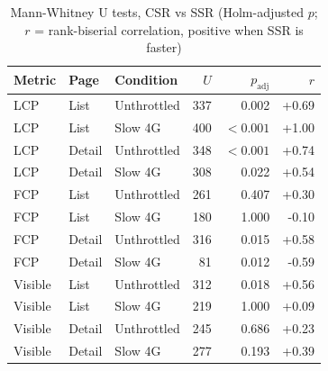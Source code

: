 \begin{table}[t]
\caption{Mann-Whitney U tests, CSR vs SSR (Holm-adjusted $p$; $r$ = rank-biserial correlation, positive when SSR is faster)}
\label{tab:stats}
\centering
\footnotesize
\setlength{\tabcolsep}{3pt}
\begin{tabular}{@{}lllrrr@{}}
\toprule
Metric & Page & Condition & $U$ & $p_{\mathrm{adj}}$ & $r$ \\
\midrule
LCP & List & Unthrottled & 337 & 0.002 & +0.69 \\
LCP & List & Slow 4G & 400 & $<0.001$ & +1.00 \\
LCP & Detail & Unthrottled & 348 & $<0.001$ & +0.74 \\
LCP & Detail & Slow 4G & 308 & 0.022 & +0.54 \\
FCP & List & Unthrottled & 261 & 0.407 & +0.30 \\
FCP & List & Slow 4G & 180 & 1.000 & -0.10 \\
FCP & Detail & Unthrottled & 316 & 0.015 & +0.58 \\
FCP & Detail & Slow 4G & 81 & 0.012 & -0.59 \\
Visible & List & Unthrottled & 312 & 0.018 & +0.56 \\
Visible & List & Slow 4G & 219 & 1.000 & +0.09 \\
Visible & Detail & Unthrottled & 245 & 0.686 & +0.23 \\
Visible & Detail & Slow 4G & 277 & 0.193 & +0.39 \\
\bottomrule
\end{tabular}
\end{table}
